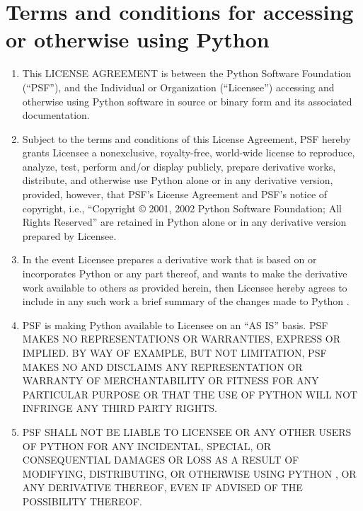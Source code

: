 \section{Terms and conditions for accessing or otherwise using Python}

\centerline{}

\begin{enumerate}
\item
This LICENSE AGREEMENT is between the Python Software Foundation
(``PSF''), and the Individual or Organization (``Licensee'') accessing
and otherwise using Python \version{} software in source or binary
form and its associated documentation.

\item
Subject to the terms and conditions of this License Agreement, PSF
hereby grants Licensee a nonexclusive, royalty-free, world-wide
license to reproduce, analyze, test, perform and/or display publicly,
prepare derivative works, distribute, and otherwise use Python
\version{} alone or in any derivative version, provided, however, that
PSF's License Agreement and PSF's notice of copyright, i.e.,
``Copyright \copyright{} 2001, 2002 Python Software Foundation; All
Rights Reserved'' are retained in Python \version{} alone or in any
derivative version prepared by Licensee.

\item
In the event Licensee prepares a derivative work that is based on
or incorporates Python \version{} or any part thereof, and wants to
make the derivative work available to others as provided herein, then
Licensee hereby agrees to include in any such work a brief summary of
the changes made to Python \version.

\item
PSF is making Python \version{} available to Licensee on an ``AS IS''
basis.  PSF MAKES NO REPRESENTATIONS OR WARRANTIES, EXPRESS OR
IMPLIED.  BY WAY OF EXAMPLE, BUT NOT LIMITATION, PSF MAKES NO AND
DISCLAIMS ANY REPRESENTATION OR WARRANTY OF MERCHANTABILITY OR FITNESS
FOR ANY PARTICULAR PURPOSE OR THAT THE USE OF PYTHON \version{} WILL
NOT INFRINGE ANY THIRD PARTY RIGHTS.

\item
PSF SHALL NOT BE LIABLE TO LICENSEE OR ANY OTHER USERS OF PYTHON
\version{} FOR ANY INCIDENTAL, SPECIAL, OR CONSEQUENTIAL DAMAGES OR
LOSS AS A RESULT OF MODIFYING, DISTRIBUTING, OR OTHERWISE USING PYTHON
\version, OR ANY DERIVATIVE THEREOF, EVEN IF ADVISED OF THE
POSSIBILITY THEREOF.


\end{enumerate}
